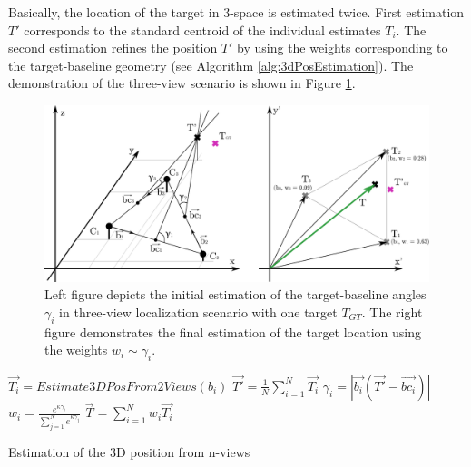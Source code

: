 Basically, the location of the target in 3-space is estimated twice. First estimation $T'$ corresponds to the standard centroid of the individual estimates $T_{i}$. The second estimation refines the position $T'$ by using the weights corresponding to the target-baseline geometry (see Algorithm \ref{alg:3dPosEstimation}). The demonstration of the three-view scenario is shown in Figure \ref{fig:target-base_and_weighted_centroid}.

\begin{figure}[htb]\centering
	\centering
	\includegraphics[width=0.8\linewidth]{fig/target-base_and_weighted_centroid.pdf}
	\caption{Left figure depicts the initial estimation of the target-baseline angles $\gamma_{i}$ in three-view localization scenario with one target $T_{GT}$. The right figure demonstrates the final estimation of the target location using the weights $w_{i} \sim \gamma_{i}$.}
	\label{fig:target-base_and_weighted_centroid}
\end{figure}

\begin{algorithm}
	\SetAlgoNoLine	
	\DontPrintSemicolon
	\BlankLine
	
	{
		$\vec{T_{i}} = Estimate3DPosFrom2Views(b_{i})$\;
	}
	$\vec{T'} = \frac{1}{N}\sum_{i=1}^{N}\vec{T_{i}}$\;	
	{
		$\gamma_{i} = |\vec{b_{i}}(\vec{T'} - \vec{bc_{i}})|$\;
		$w_{i} = \frac{e^{\kappa\gamma_{i}}}{\sum_{j=1}^{N}e^{\kappa\gamma_{j}}}$\;
	}
	$\vec{T} = \sum_{i=1}^{N}w_{i}\vec{T_{i}}$	
	\caption{Estimation of the 3D position from n-views}
	\label{alg:3dPosEstimation}
\end{algorithm}


